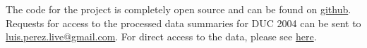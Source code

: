 \documentclass[10pt]{article}
\begin{document}
The code for the project is completely open source and can be found on \href{https://github.com/kandluis/document_summaries}{github}. Requests for access to the processed data summaries for DUC 2004 can be sent to \href{mailto:luis.perez.live@gmail.com}{luis.perez.live@gmail.com}. For direct access to the data, please see \href{https://www.dropbox.com/sh/dzmzh5nwe1i68ra/AABYPkOj6lXZln5I6tEDjpAna?dl=0}{here}.



\end{document}
